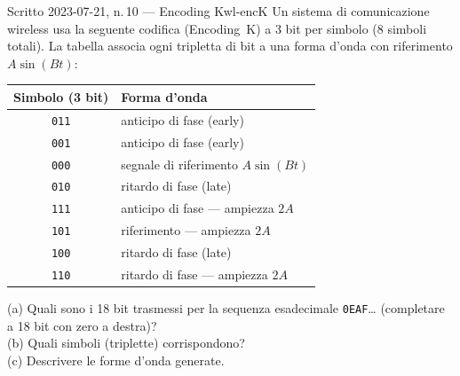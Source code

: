 \documentclass{report}
\begin{document}
\begin{Exercise}{Scritto 2023-07-21, n.\,10 --- Encoding K}{wl-encK}
Un sistema di comunicazione wireless usa la seguente codifica (Encoding~K) a
3 bit per simbolo (8 simboli totali). La tabella associa ogni tripletta di bit a
una forma d'onda con riferimento $A\sin(Bt)$:

\begin{center}
\begin{tabular}{cl}
\hline
Simbolo (3 bit) & Forma d'onda \\
\hline
\texttt{011} & anticipo di fase (early) \\
\texttt{001} & anticipo di fase (early) \\
\texttt{000} & segnale di riferimento $A\sin(Bt)$ \\
\texttt{010} & ritardo di fase (late) \\
\texttt{111} & anticipo di fase --- ampiezza $2A$ \\
\texttt{101} & riferimento --- ampiezza $2A$ \\
\texttt{100} & ritardo di fase (late) \\
\texttt{110} & ritardo di fase --- ampiezza $2A$ \\
\hline
\end{tabular}
\end{center}

(a) Quali sono i 18 bit trasmessi per la sequenza esadecimale \texttt{0EAF}\ldots
    (completare a 18 bit con zero a destra)?\\
(b) Quali simboli (triplette) corrispondono?\\
(c) Descrivere le forme d'onda generate.
\end{Exercise}
\end{document}
